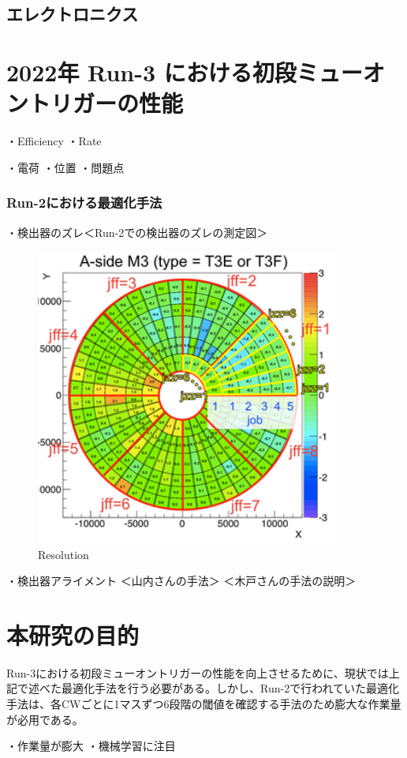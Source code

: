 \subsection{エレクトロニクス}

\section{2022年 Run-3 における初段ミューオントリガーの性能}
・Efficiency
・Rate

・電荷
・位置
・問題点


\subsubsection{Run-2における最適化手法}
・検出器のズレ＜Run-2での検出器のズレの測定図＞
\begin{figure}[tb]
  \centering
  \includegraphics[clip, width=10cm]{fig/4/zure.png}
  \caption{Resolution}
  \label{fig:Resolution}
\end{figure}
・検出器アライメント
＜山内さんの手法＞
＜木戸さんの手法の説明＞


\section{本研究の目的}


Run-3における初段ミューオントリガーの性能を向上させるために、現状では上記で述べた最適化手法を行う必要がある。しかし、Run-2で行われていた最適化手法は、各CWごとに1マスずつ6段階の閾値を確認する手法のため膨大な作業量が必用である。

・作業量が膨大
・機械学習に注目














